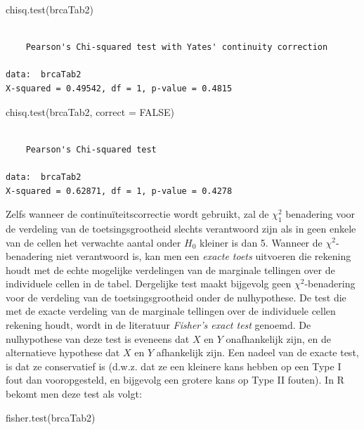 \documentclass[
  dutch,
  letterpaper,
  12pt]{book}
\newenvironment{Shaded}{\begin{snugshade}}{\end{snugshade}}
\newcommand{\AttributeTok}[1]{\textcolor[rgb]{0.40,0.45,0.13}{#1}}
\newcommand{\ConstantTok}[1]{\textcolor[rgb]{0.56,0.35,0.01}{#1}}
\newcommand{\FunctionTok}[1]{\textcolor[rgb]{0.28,0.35,0.67}{#1}}
\newcommand{\NormalTok}[1]{\textcolor[rgb]{0.00,0.23,0.31}{#1}}
\theoremstyle{definition}
\theoremstyle{definition}
\theoremstyle{definition}
\theoremstyle{remark}
\begin{document}
\begin{Shaded}
\begin{Highlighting}[]
\FunctionTok{chisq.test}\NormalTok{(brcaTab2)}
\end{Highlighting}
\end{Shaded}

\begin{verbatim}

    Pearson's Chi-squared test with Yates' continuity correction

data:  brcaTab2
X-squared = 0.49542, df = 1, p-value = 0.4815
\end{verbatim}

\begin{Shaded}
\begin{Highlighting}[]
\FunctionTok{chisq.test}\NormalTok{(brcaTab2, }\AttributeTok{correct =} \ConstantTok{FALSE}\NormalTok{)}
\end{Highlighting}
\end{Shaded}

\begin{verbatim}

    Pearson's Chi-squared test

data:  brcaTab2
X-squared = 0.62871, df = 1, p-value = 0.4278
\end{verbatim}

Zelfs wanneer de continuïteitscorrectie wordt gebruikt, zal de
\(\chi^2_1\) benadering voor de verdeling van de toetsingsgrootheid
slechts verantwoord zijn als in geen enkele van de cellen het verwachte
aantal onder \(H_0\) kleiner is dan 5. Wanneer de \(\chi^2\)-benadering
niet verantwoord is, kan men een \emph{exacte toets} uitvoeren die
rekening houdt met de echte mogelijke verdelingen van de marginale
tellingen over de individuele cellen in de tabel. Dergelijke test maakt
bijgevolg geen \(\chi^2\)-benadering voor de verdeling van de
toetsingsgrootheid onder de nulhypothese. De test die met de exacte
verdeling van de marginale tellingen over de individuele cellen rekening
houdt, wordt in de literatuur \emph{Fisher's exact test} genoemd. De
nulhypothese van deze test is eveneens dat \(X\) en \(Y\) onafhankelijk
zijn, en de alternatieve hypothese dat \(X\) en \(Y\) afhankelijk zijn.
Een nadeel van de exacte test, is dat ze conservatief is (d.w.z. dat ze
een kleinere kans hebben op een Type I fout dan vooropgesteld, en
bijgevolg een grotere kans op Type II fouten). In R bekomt men deze test
als volgt:

\begin{Shaded}
\begin{Highlighting}[]
\FunctionTok{fisher.test}\NormalTok{(brcaTab2)}
\end{Highlighting}
\end{Shaded}
\end{document}
